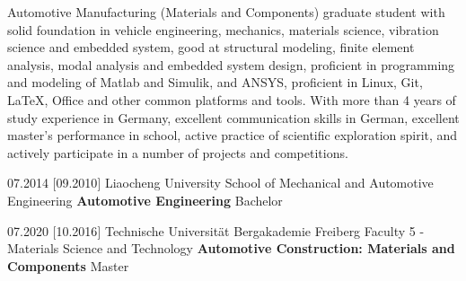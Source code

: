 \documentclass{resume}
\begin{document}
\makeheader

\bigskip

Automotive Manufacturing (Materials and Components) graduate student with solid foundation in vehicle engineering, mechanics, materials science, vibration science and embedded system, good at structural modeling, finite element analysis, modal analysis and embedded system design, proficient in programming and modeling of Matlab and Simulik, and ANSYS,  proficient in Linux, Git, LaTeX, Office and other common platforms and tools. With more than 4 years of study experience in Germany, excellent communication skills in German, excellent master's performance in school, active practice of scientific exploration spirit, and actively participate in a number of projects and competitions.

\bigskip



\begin{spacing}{1.3}
	\begin{educations}
		\education%
		{{\large 07.2014}}%
		[{\large 09.2010}]%
		{{\large Liaocheng University}}%
		{{\large School of Mechanical and Automotive Engineering}}%
		{\textbf{{\large Automotive Engineering}}}%
		{{\large Bachelor}}
		
		\separator{1ex}
		
		\education%
		{{\large 07.2020}}%
		[{\large 10.2016}]%
		{{\large Technische Universität Bergakademie Freiberg}}%
		{{\large Faculty 5 - Materials Science and Technology}}%
		{\textbf{{\large Automotive Construction: Materials and Components}}}%
		{{\large Master}}
	\end{educations}
\end{spacing}

\bigskip
\end{document}
